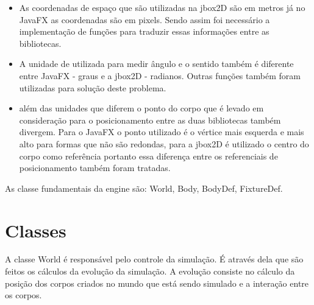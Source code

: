 \begin{itemize}
	\item As coordenadas de espaço que são utilizadas na jbox2D são em metros já no JavaFX as coordenadas são em pixels. Sendo assim foi necessário a implementação de funções para traduzir essas informações entre as bibliotecas.
	\item A unidade de utilizada para medir ângulo e o sentido também é diferente entre JavaFX - graus e a jbox2D - radianos. Outras funções também foram utilizadas para solução deste problema.
	\item além das unidades que diferem o ponto do corpo que é levado em consideração para o posicionamento entre as duas bibliotecas também divergem. Para o JavaFX o ponto utilizado é o vértice mais esquerda e mais alto para formas que não são redondas, para a jbox2D é utilizado o centro do corpo como referência portanto essa diferença entre os referenciais de posicionamento também foram tratadas.
\end{itemize}


As classe fundamentais da engine são: World, Body, BodyDef, FixtureDef.

\section{Classes}

A classe World é responsável pelo controle da simulação. É através dela que são feitos os cálculos da evolução da simulação. A evolução consiste no cálculo da posição dos corpos criados no mundo que está sendo simulado e a interação entre os corpos.
